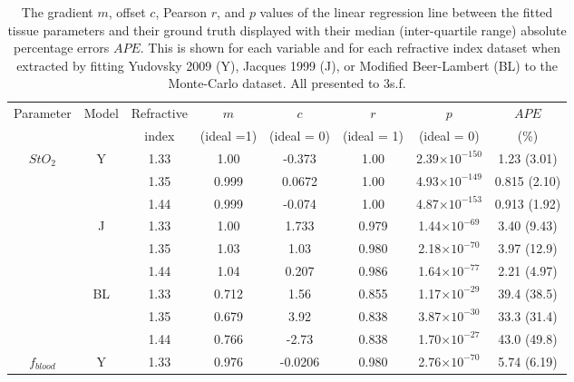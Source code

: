\begin{table}[htb!]
    \centering
    \caption{The gradient $m$, offset $c$, Pearson $r$, and $p$ values of the linear regression line between the fitted tissue parameters and their ground truth displayed with their median (inter-quartile range) absolute percentage errors $APE$. This is shown for each variable and for each refractive index dataset when extracted by fitting Yudovsky 2009 (Y), Jacques 1999 (J), or Modified Beer-Lambert (BL) to the Monte-Carlo dataset. All presented to 3s.f.}
    \begin{tabular}{|ccc|ccccc|}
        \hline
        Parameter & Model & Refractive & $m$ & $c$ & $r$ & $p$ & $APE$ \\
        & & index & (ideal =1) & (ideal = 0) & (ideal = 1) & (ideal = 0) & (\%)\\
        \hline
        \multirow{9}{*}{$StO_2$} & \multirow{3}{*}{Y} & 1.33 & 1.00 & -0.373 & 1.00 & 2.39$\times 10^{-150}$ & 1.23 (3.01) \\
        & & 1.35 & 0.999 & 0.0672 & 1.00 & 4.93$\times 10^{-149}$ & 0.815 (2.10) \\
        & & 1.44 & 0.999 & -0.074 & 1.00 & 4.87$\times 10^{-153}$ & 0.913 (1.92) \\
        \cline{2-8}
        & \multirow{3}{*}{J} & 1.33 & 1.00 & 1.733 & 0.979 & 1.44$\times 10^{-69}$ & 3.40 (9.43) \\
        & & 1.35 & 1.03 & 1.03 & 0.980 & 2.18$\times 10^{-70}$ & 3.97 (12.9) \\
        & & 1.44 &  1.04 & 0.207 & 0.986 & 1.64$\times 10^{-77}$ & 2.21 (4.97) \\
        \cline{2-8}
        & \multirow{3}{*}{BL} & 1.33 & 0.712 & 1.56 & 0.855 & 1.17$\times 10^{-29}$ & 39.4 (38.5) \\
        & & 1.35 & 0.679 & 3.92 & 0.838 & 3.87$\times 10^{-30}$ & 33.3 (31.4) \\
        & & 1.44 & 0.766 & -2.73 & 0.838 & 1.70$\times 10^{-27}$ & 43.0 (49.8) \\
        \hline
        \multirow{9}{*}{$f_{blood}$} & \multirow{3}{*}{Y} & 1.33 & 0.976 & -0.0206 & 0.980 & 2.76$\times 10^{-70}$ & 5.74 (6.19) \\

\end{tabular}
\end{table}
